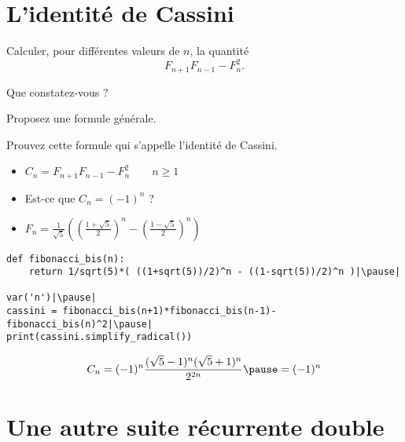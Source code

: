 \section{L'identité de Cassini}

\begin{frame}


\medskip

\begin{tp}
Calculer, pour différentes valeurs de $n$, la quantité
$$F_{n+1}F_{n-1}-F_n^2.$$

Que constatez-vous ? 

Proposez une formule générale.

Prouvez cette formule qui s'appelle l'identité de Cassini.   
\end{tp}
\end{frame}


\begin{frame}[fragile]

\begin{itemize}
  \item $C_n = F_{n+1}F_{n-1}-F_n^2 \qquad n \ge 1$
  \pause
  \item Est-ce que $C_n = (-1)^n$ ?
  \pause
  \item $F_n = \frac{1}{\sqrt5}\left(\left(\frac{1+\sqrt5}{2}\right)^n- 
  \left(\frac{1-\sqrt5}{2}\right)^n\right)$
  
\end{itemize}

\pause 
{\footnotesize
\begin{algo}
\begin{lstlisting}
def fibonacci_bis(n):
    return 1/sqrt(5)*( ((1+sqrt(5))/2)^n - ((1-sqrt(5))/2)^n )|\pause|

var('n')|\pause|
cassini = fibonacci_bis(n+1)*fibonacci_bis(n-1)-fibonacci_bis(n)^2|\pause|
print(cassini.simplify_radical())
\end{lstlisting}
\end{algo}
}

\pause

$$C_n = (-1) ^n \frac{(\sqrt 5 -1)^n (\sqrt 5 + 1)^n}{2^{2n}} \pause= (-1)^n$$

\end{frame}


\section{Une autre suite récurrente double}


